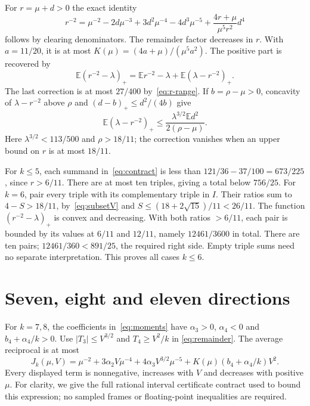 \documentclass[11pt]{article}
\newcommand{\EE}{\mathbb E}
\newcommand{\pos}[1]{(#1)_+}
\begin{document}
For $r=\mu+d>0$ the exact identity
\begin{equation}\label{eq:remainder}
 r^{-2}=\mu^{-2}-2d\mu^{-3}+3d^2\mu^{-4}-4d^3\mu^{-5}
       +\frac{4r+\mu}{\mu^5r^2}d^4
\end{equation}
follows by clearing denominators. The remainder factor decreases in
$r$. With $a=11/20$, it is at most
$K(\mu)=(4a+\mu)/(\mu^5a^2)$.
The positive part is recovered by
\begin{equation}\label{eq:clip}
 \EE\pos{r^{-2}-\lambda}=\EE r^{-2}-\lambda+
 \EE\pos{\lambda-r^{-2}}.
\end{equation}
The last correction is at most $27/400$ by~\eqref{eq:r-range}.
If $b=\rho-\mu>0$, concavity of $\lambda-r^{-2}$ above $\rho$
and $(d-b)_+\le d^2/(4b)$ give
\begin{equation}\label{eq:clipvariance}
 \EE\pos{\lambda-r^{-2}}\le\frac{\lambda^{3/2}\EE d^2}{2(\rho-\mu)}.
\end{equation}
Here $\lambda^{3/2}<113/500$ and $\rho>18/11$; the correction
vanishes when an upper bound on $r$ is at most $18/11$.

For $k\le5$, each summand in~\eqref{eq:contract} is less than
$121/36-37/100=673/225$, since $r>6/11$.
There are at most ten triples, giving a total below $756/25$.
For $k=6$, pair every triple with its complementary triple in $I$.
Their ratios sum to $4-S>18/11$, by~\eqref{eq:subsetV} and
$S\le(18+2\sqrt{15})/11<26/11$.
The function $(r^{-2}-\lambda)_+$ is convex and decreasing.
With both ratios $>6/11$, each pair is bounded by its values at
$6/11$ and $12/11$, namely $12461/3600$ in total.
There are ten pairs; $12461/360<891/25$, the required right side.
Empty triple sums need no separate interpretation. This proves all
cases $k\le6$.

\section{Seven, eight and eleven directions}
For $k=7,8$, the coefficients in~\eqref{eq:moments} have
$\alpha_3>0$, $\alpha_4<0$ and $b_4+\alpha_4/k>0$.
Use $|T_3|\le V^{3/2}$ and $T_4\ge V^2/k$ in
\eqref{eq:remainder}. The average reciprocal is at most
\begin{equation}\label{eq:78env}
 J_k(\mu,V)=\mu^{-2}+3\alpha_2V\mu^{-4}
 +4\alpha_3V^{3/2}\mu^{-5}
 +K(\mu)(b_4+\alpha_4/k)V^2.
\end{equation}
Every displayed term is nonnegative, increases with $V$ and decreases
with positive $\mu$. For clarity, we give the full rational interval
certificate contract used to bound this expression; no sampled frames
or floating-point inequalities are required.
\end{document}

